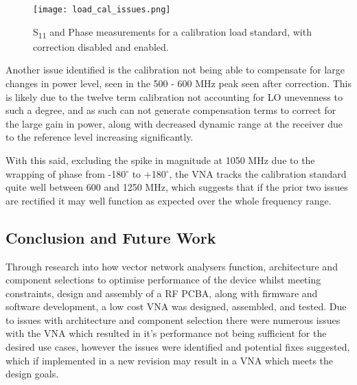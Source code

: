 \begin{figure}[H]
	\centering
	\texttt{[image: load\_cal\_issues.png]}
	\caption{S\textsubscript{11} and Phase measurements for a calibration load standard, with correction disabled and enabled.}
	\label{fig:cal_sucks}
\end{figure}

Another issue identified is the calibration not being able to compensate for large changes in power level, seen in the 500 - 600 MHz peak seen after correction. This is likely due to the twelve term calibration not accounting for LO unevenness to such a degree, and as such can not generate compensation terms to correct for the large gain in power, along with decreased dynamic range at the receiver due to the reference level increasing significantly. 

With this said, excluding the spike in magnitude at 1050 MHz due to the wrapping of phase from -180$^\circ$ to +180$^\circ$, the VNA tracks the calibration standard quite well between 600 and 1250 MHz, which suggests that if the prior two issues are rectified it may well function as expected over the whole frequency range. 

\subsection{Conclusion and Future Work}
Through research into how vector network analysers function, architecture and component selections to optimise performance of the device whilst meeting constraints, design and assembly of a RF PCBA, along with firmware and software development, a low cost VNA was designed, assembled, and tested. Due to issues with architecture and component selection there were numerous issues with the VNA which resulted in it's performance not being sufficient for the desired use cases, however the issues were identified and potential fixes suggested, which if implemented in a new revision may result in a VNA which meets the design goals. 

